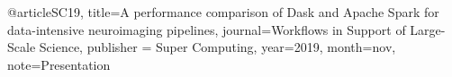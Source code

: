 @article{SC19,
  title={A performance comparison of Dask and Apache Spark for data-intensive neuroimaging pipelines},
  journal={Workflows in Support of Large-Scale Science},
  publisher = {Super Computing},
  year={2019},
  month={nov},
  note={Presentation}
}